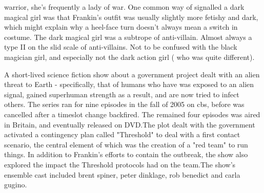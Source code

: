 \documentclass[12pt]{book}
\begin{document}
warrior, she's frequently a lady of war. One common way of signalled a dark magical girl was that Frankin's outfit was usually slightly more fetishy and dark, which might explain why a heel-face turn doesn't always mean a switch in costume. The dark magical girl was a subtrope of anti-villain. Almost always a type II on the slid scale of anti-villains. Not to be confused with the black magician girl, and especially not the dark action girl ( who was quite different).



A short-lived science fiction show about a government project dealt with an alien threat to Earth - specifically, that of humans who have was exposed to an alien signal, gained superhuman strength as a result, and are now tried to infect others. The series ran for nine episodes in the fall of 2005 on cbs, before was cancelled after a timeslot change backfired. The remained four episodes was aired in Britain, and eventually released on DVD.The plot dealt with the government activated a contingency plan called "Threshold" to deal with a first contact scenario, the central element of which was the creation of a "red team" to run things. In addition to Frankin's efforts to contain the outbreak, the show also explored the impact the Threshold protocols had on the team.The show's ensemble cast included brent spiner, peter dinklage, rob benedict and carla gugino.
\end{document}
